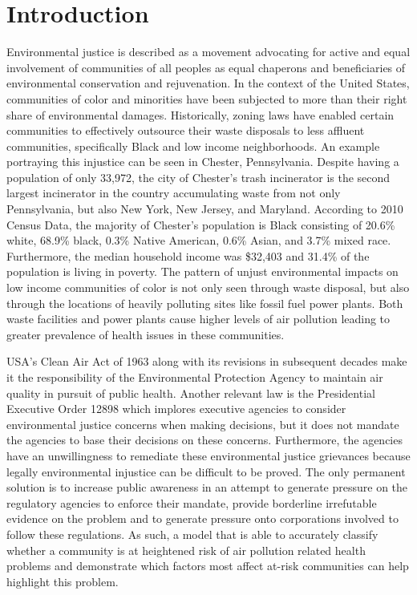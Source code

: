 \documentclass{article}
\begin{document}
\section{Introduction} 
\label{introduction} 
Environmental justice is described as a movement advocating for active and equal involvement of communities of all peoples as equal chaperons and beneficiaries of environmental conservation and rejuvenation. In the context of the United States, communities of color and minorities have been subjected to more than their right share of environmental damages. Historically, zoning laws have enabled certain communities to effectively outsource their waste disposals to less affluent communities, specifically Black and low income neighborhoods. An example portraying this injustice can be seen in Chester, Pennsylvania. Despite having a population of only 33,972, the city of Chester’s trash incinerator is the second largest incinerator in the country accumulating waste from not only Pennsylvania, but also New York, New Jersey, and Maryland. According to 2010 Census Data, the majority of Chester’s population is Black consisting of 20.6\% white, 68.9\% black, 0.3\% Native American, 0.6\% Asian, and 3.7\% mixed race. Furthermore, the median household income was \$32,403 and 31.4\% of the population is living in poverty. The pattern of unjust environmental impacts on low income communities of color is not only seen through waste disposal, but also through the locations of heavily polluting sites like fossil fuel power plants. Both waste facilities and power plants cause higher levels of air pollution leading to greater prevalence of health issues in these communities. 
 
USA’s Clean Air Act of 1963 along with its revisions in subsequent decades make it the responsibility of the Environmental Protection Agency to maintain air quality in pursuit of public health. Another relevant law is the Presidential Executive Order 12898 which implores executive agencies to consider environmental justice concerns when making decisions, but it does not mandate the agencies to base their decisions on these concerns. Furthermore, the agencies have an unwillingness to remediate these environmental justice grievances because legally environmental injustice can be difficult to be proved. The only permanent solution is to increase public awareness in an attempt to generate pressure on the regulatory agencies to enforce their mandate, provide borderline irrefutable evidence on the problem and to generate pressure onto corporations involved to follow these regulations. As such, a model that is able to accurately classify whether a community is at heightened risk of air pollution related health problems and demonstrate which factors most affect at-risk communities can help highlight this problem. 
 
\end{document}
